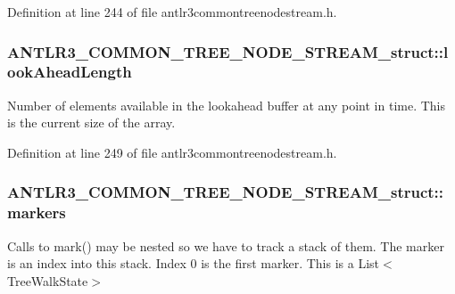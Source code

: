 Definition at line 244 of file antlr3commontreenodestream.\-h.

\hypertarget{struct_a_n_t_l_r3___c_o_m_m_o_n___t_r_e_e___n_o_d_e___s_t_r_e_a_m__struct_a3318806fbdd5c764458061ea1589bc1d}{
\subsubsection[{look\-Ahead\-Length}]{ A\-N\-T\-L\-R3\-\_\-\-C\-O\-M\-M\-O\-N\-\_\-\-T\-R\-E\-E\-\_\-\-N\-O\-D\-E\-\_\-\-S\-T\-R\-E\-A\-M\-\_\-struct\-::look\-Ahead\-Length}}\label{struct_a_n_t_l_r3___c_o_m_m_o_n___t_r_e_e___n_o_d_e___s_t_r_e_a_m__struct_a3318806fbdd5c764458061ea1589bc1d}
Number of elements available in the lookahead buffer at any point in time. This is the current size of the array. 

Definition at line 249 of file antlr3commontreenodestream.\-h.

\hypertarget{struct_a_n_t_l_r3___c_o_m_m_o_n___t_r_e_e___n_o_d_e___s_t_r_e_a_m__struct_a883a6f5de07dc980cc8f0945c90f8ce0}{
\subsubsection[{markers}]{ A\-N\-T\-L\-R3\-\_\-\-C\-O\-M\-M\-O\-N\-\_\-\-T\-R\-E\-E\-\_\-\-N\-O\-D\-E\-\_\-\-S\-T\-R\-E\-A\-M\-\_\-struct\-::markers}}\label{struct_a_n_t_l_r3___c_o_m_m_o_n___t_r_e_e___n_o_d_e___s_t_r_e_a_m__struct_a883a6f5de07dc980cc8f0945c90f8ce0}
Calls to mark() may be nested so we have to track a stack of them. The marker is an index into this stack. Index 0 is the first marker. This is a List$<$\-Tree\-Walk\-State$>$ 

